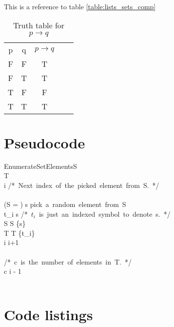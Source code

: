 \documentclass[12pt, letterpaper, oneside]{article}
\begin{document}
This is a reference to table \ref{table:lists_sets_comp}

\begin{table}[H]
  \centering
  \begin{tabular}{|c|c|c|ll}
    \cline{1-3}
    p & q & $p \rightarrow q$ &  & \\ [1ex] \cline{1-3}
    F & F & T                 &  & \\ [0.5ex] \cline{1-3}
    F & T & T                 &  & \\ [0.5ex] \cline{1-3}
    T & F & F                 &  & \\ [0.5ex] \cline{1-3}
    T & T & T                 &  & \\ [0.5ex] \cline{1-3}
  \end{tabular}
  \caption{Truth table for $p \rightarrow q$}
\end{table}

\section{Pseudocode}

\begin{pseudocode}[ruled]{EnumerateSetElements}{S}
   \\
  T \GETS \emptyset \\
  i  \mbox{/* Next index of the picked element from S. */} \\
  \\
  \WHILE \NOT (S = \emptyset) \DO
  \BEGIN
  s \GETS \mbox{pick a random element from S} \\
  t_i \GETS s \mbox{/* $t_i$ is just an indexed symbol to denote s. */} \\
  S \GETS S \setminus \{s\} \\
  T \GETS T \cup \{t_i\} \\
  i \GETS i+1
  \END \\
  \\
  \mbox{/* c is the number of elements in T. */} \\
  c \GETS i - 1 \\
  \\
\end{pseudocode}

\section{Code listings}
\end{document}
